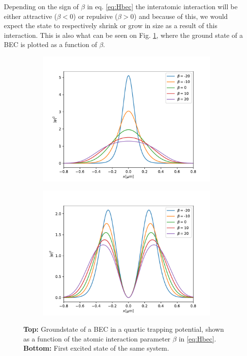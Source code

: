 \documentclass[a4paper, twocolumn]{revtex4-1}
\begin{document}
Depending on the sign of $\beta$ in eq. \eqref{eq:Hbec} the interatomic interaction will be either attractive ($\beta<0$) or repulsive ($\beta>0$) and because of this, we would expect the state to respectively shrink or grow in size as a result of this interaction. This is also what can be seen on Fig. \ref{fig:BECstates}, where the ground state of a BEC is plotted as a function of $\beta$.
\begin{figure}[h]
	\begin{subfigure}{\columnwidth}
		\includegraphics[width=\columnwidth]{graphics/stateAnalysis/GroundstateBeta.pdf}
	\end{subfigure}
	\begin{subfigure}{\columnwidth}
		\includegraphics[width=\columnwidth]{graphics/stateAnalysis/ExcitedstateBeta.pdf}
	\end{subfigure}
	\caption{\textbf{Top:} Groundstate of a BEC in a quartic trapping potential, shown as a function of the atomic interaction parameter $\beta$ in \ref{eq:Hbec}. \textbf{Bottom:} First excited state of the same system.}
	\label{fig:BECstates}
\end{figure}
\end{document}
